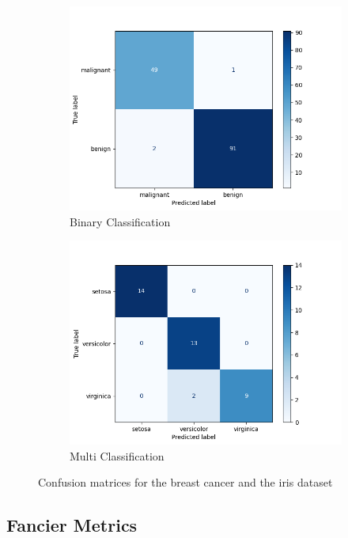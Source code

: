 \documentclass{article}
\begin{document}
\begin{figure}[H]
\centering
\begin{subfigure}{.5\textwidth}
  \centering
  \includegraphics[width=\linewidth]{Images/twoclassconfmat.png}
  \caption{Binary Classification}
\end{subfigure}%
\begin{subfigure}{.5\textwidth}
  \centering
  \includegraphics[width=\linewidth]{Images/threeclassconfmat.png}
  \caption{Multi Classification}
\end{subfigure}
\caption{Confusion matrices for the breast cancer and the iris dataset}
\end{figure}

\subsection{Fancier Metrics}
\end{document}
